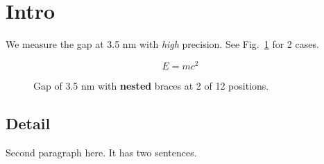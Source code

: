 \documentclass{article}
\begin{document}
\section{Intro}
We measure the gap at 3.5 nm with \emph{high} precision. See Fig.~\ref{fig:12} for 2 cases.


\begin{equation}
E = mc^2
\end{equation}

\begin{figure}
\caption{Gap of 3.5 nm with {\bf nested} braces at 2 of 12 positions.}
\label{fig:12}
\end{figure}

\subsection{Detail}
Second paragraph here. It has two sentences.
\end{document}
